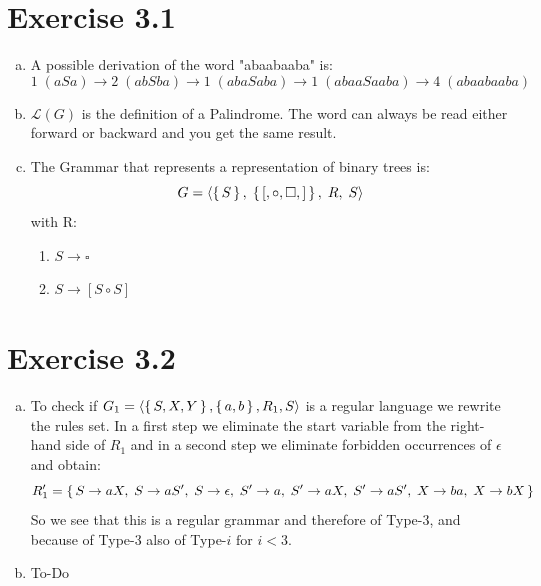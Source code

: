 \documentclass{article} %
\newcommand{\homeworkNumber}{3}
\begin{document}
\section*{Exercise \homeworkNumber.1}
\begin{enumerate}[(a)]
	\item
	A possible derivation of the word "abaabaaba" is:
	$$
	1 \; (aSa) \to 2 \; (abSba) \to 1 \; (abaSaba) \to 1 \; (abaaSaaba) \to 4 \; (abaabaaba)
	$$
	
	\item
	$\mathcal{L}(G)$ is the definition of a Palindrome. The word can always be read either forward or
	backward and you get the same result.
	
	\item
	The Grammar that represents a representation of binary trees is:
	$$
	G = \left \langle \set{S}, \; \set{[, \circ, \square, ]}, \; R, \; S \right \rangle
	$$
	with R:
	\begin{enumerate}[1)]
		\item
		$S \to \square$
		
		\item
		$S \to [S \circ S]$
		
	\end{enumerate}
	
\end{enumerate}

\clearpage

\section*{Exercise \homeworkNumber.2}
\begin{enumerate}[(a)]
	\item
	To check if $G_1 = \left \langle \set{S, X, Y}, \set{a, b}, R_1, S \right \rangle$ is a regular
	language we rewrite the rules set. In a first step we eliminate the start variable from the
	right-hand side of $R_1$ and in a second step we eliminate forbidden occurrences of $\epsilon$ and
	obtain:
	$$
	R_1' = \set{S \to aX, \; S \to aS', \; S \to \epsilon, \; S' \to a, \; S' \to aX, \; S' \to aS', \;
	X \to ba, \; X \to bX}
	$$
	So we see that this is a regular grammar and therefore of Type-3, and because of Type-3 also of
	Type-$i \text{ for } i < 3$.

	\item
	To-Do

\end{enumerate}

\clearpage
\end{document}
